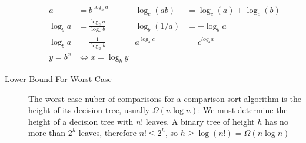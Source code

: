 \documentclass[8pt]{article}
\begin{document}
\begin{multicols}{2}
\begin{description}
\begin{equation*}
\begin{aligned}
        a &= b^{\log_b a} &
        \log_c(ab) &= \log_c(a) + \log_c(b) \\
        \log_b a &= \frac{\log_c a}{\log_c b} &
        \log_b(1/a) &= -\log_b a \\
        \log_b a &= \frac{1}{\log_a b} &
        a^{\log_b c} &= c^{log_b a} \\
        y = b^x &\Leftrightarrow x=\log_b y &
      \end{aligned}
    \end{equation*}
  \item[Lower Bound For Worst-Case] The worst case nuber of
    comparisons for a comparison sort algorithm is the height of its
    decision tree, usually $\Omega(n\log n)$: We must determine the
    height of a decision tree with $n!$ leaves. A binary tree of
    height $h$ has no more than $2^h$ leaves, therefore $n!\le2^h$, so
    $h\ge\log(n!) = \Omega(n\log n)$
  \end{description} %
\end{multicols}
\end{document}
